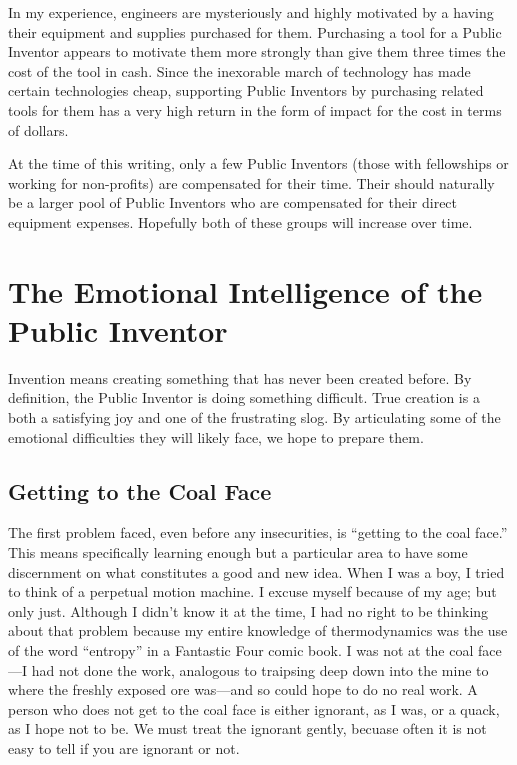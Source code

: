 \documentclass[
	fontsize=10pt, %
	twoside=false, %
	secnumdepth=1, %
]{kaobook}
\begin{document}
In my experience, engineers are mysteriously and highly motivated by a having their
equipment and supplies purchased for them.
Purchasing a tool for a Public Inventor appears to motivate them more strongly
than give them three times the cost of the tool in cash. Since
the inexorable march of technology has made certain technologies cheap,
supporting Public Inventors by purchasing related tools for them
has a very high return in the form of impact for the cost in terms of
dollars.

At the time of this writing, only a few Public Inventors (those
with fellowships or working for non-profits) are compensated for their
time. Their should naturally be a larger pool of Public Inventors who
are compensated for their direct equipment expenses. Hopefully
both of these groups will increase over time.

\chapter{The Emotional Intelligence of the Public Inventor}

Invention means creating something that has never been
created before.
By definition, the Public Inventor is doing something
difficult.
True creation is a both a satisfying
joy and one of the frustrating slog.
By articulating some of the emotional difficulties
they will likely face, we hope to prepare them.

\section{Getting to the Coal Face}

The first problem faced, even before any insecurities,
is ``getting to the coal face.''
This means specifically learning enough but a particular
area to have some discernment on what constitutes a good and new idea.
When I was a boy, I tried to think of a perpetual motion machine.
I excuse myself because of my age; but only just.
Although I didn't know it at the time, I had no right to be
thinking about that problem because my entire knowledge of
thermodynamics was the use of the word ``entropy'' in a Fantastic Four comic book.
I was not at the coal face---I had not done the work, analogous to traipsing
deep down into the mine to where the freshly exposed ore was---and so could
hope to do no real work.
A person who does not get to the coal face is either ignorant,
as I was, or a quack, as I hope not to be.
We must treat the ignorant gently, becuase often it is not
easy to tell if you are ignorant or not.
\end{document}
